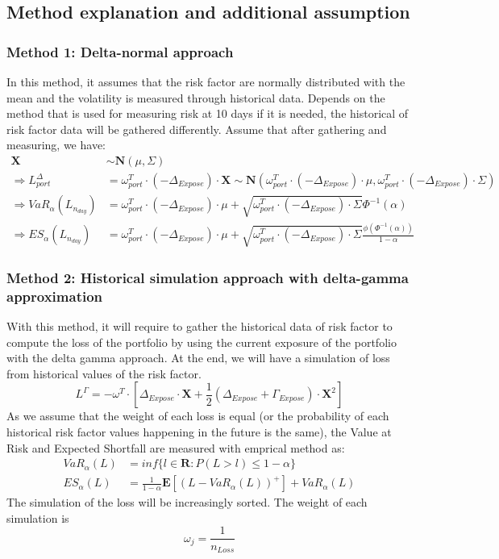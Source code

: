 \subsection{Method explanation and additional assumption}
\subsubsection{Method 1: Delta-normal approach}
In this method, it assumes that the risk factor are normally distributed with the mean and the volatility is measured through historical data. Depends on the method that is used for measuring risk at 10 days if it is needed, the historical of risk factor data will be gathered differently. Assume that after gathering and measuring, we have:
\begin{align*}
    \mathbf{X}&\sim\mathbf{N}(\mu,\Sigma)\\
    \Longrightarrow L_{port}^\Delta&=\omega_{port}^T\cdot(-\Delta_{Expose})\cdot \mathbf{X}\sim\mathbf{N}(\omega_{port}^T\cdot(-\Delta_{Expose})\cdot\mu,\omega_{port}^T\cdot(-\Delta_{Expose})\cdot\Sigma)\\
    \Longrightarrow VaR_\alpha(L_{n_{day}})&=\omega_{port}^T\cdot(-\Delta_{Expose})\cdot\mu+\sqrt{\omega_{port}^T\cdot(-\Delta_{Expose})\cdot\Sigma}\Phi^{-1}(\alpha)\\
    \Longrightarrow ES_\alpha(L_{n_{day}})&=\omega_{port}^T\cdot(-\Delta_{Expose})\cdot\mu+\sqrt{\omega_{port}^T\cdot(-\Delta_{Expose})\cdot\Sigma}\frac{\phi(\Phi^{-1}(\alpha))}{1-\alpha}
\end{align*}
\subsubsection{Method 2: Historical simulation approach with delta-gamma approximation}
With this method, it will require to gather the historical data of risk factor to compute the loss of the portfolio by using the current exposure of the portfolio with the delta gamma approach. At the end, we will have a simulation of loss from historical values of the risk factor.
\[
L^\Gamma=-\omega^T\cdot\left[\Delta_{Expose}\cdot \mathbf{X}+\frac{1}{2}\left(\Delta_{Expose}+\Gamma_{Expose}\right)\cdot\mathbf{X}^2\right]
\]
As we assume that the weight of each loss is equal (or the probability of each historical risk factor values happening in the future is the same), the Value at Risk and Expected Shortfall are measured with emprical method as:
\begin{align*}
    VaR_\alpha(L)&=inf\{l \in \mathbf{R}:P(L>l)\leq1-\alpha\}\\
    ES_\alpha(L)&=\frac{1}{1-\alpha}\mathbf{E}\left[(L-VaR_\alpha(L))^+\right]+VaR_\alpha(L)
\end{align*}
The simulation of the loss will be increasingly sorted. The weight of each simulation is \[
\omega_j=\frac{1}{n_{Loss}}
\]
